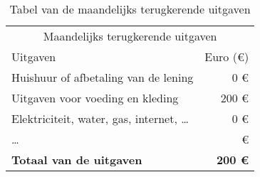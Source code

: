 \begin{table}[ht]
	\begin{minipage}[b]{0.45\linewidth}\centering
			\begin{tabular}{@{}lr@{}}
				\toprule
				         \multicolumn{2}{c}{Maandelijks terugkerende uitgaven}          \\
				\cmidrule(r){1-2}
				Uitgaven                  &        Euro (\euro{}) \\ \midrule
				Huishuur of afbetaling van de lening            &             0 \euro{} \\
				Uitgaven voor voeding en kleding                &           200 \euro{} \\
				Elektriciteit, water, gas, internet, \dots      &             0 \euro{} \\
				\dots                                           &               \euro{} \\ \toprule
				\textbf{Totaal van de uitgaven}                 & \textbf{200 \euro{}} \\ \bottomrule
			\end{tabular}
			\caption{Tabel van de maandelijks terugkerende uitgaven}
			\label{tab:tabelmaandelijksterugkerendeuitgaven}
		

\end{minipage}
\end{table}
